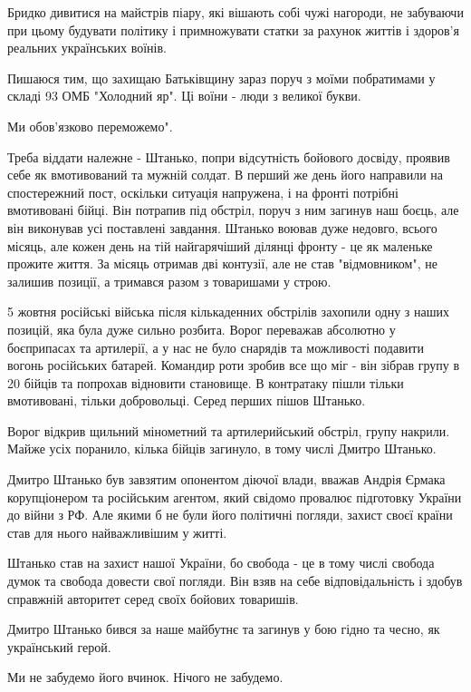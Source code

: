 Бридко дивитися на майстрів піару, які вішають собі чужі нагороди, не забуваючи
при цьому будувати політику і примножувати статки за рахунок життів і здоров'я
реальних українських воїнів.

Пишаюся тим, що захищаю Батьківщину зараз поруч з моїми побратимами у складі 93
ОМБ "Холодний яр". Ці воїни - люди з великої букви.

Ми обов'язково переможемо".

Треба віддати належне - Штанько, попри відсутність бойового досвіду, проявив
себе як вмотивований та мужній солдат. В перший же день його направили на
спостережний пост, оскільки ситуація напружена, і на фронті потрібні
вмотивовані бійці. Він потрапив під обстріл, поруч з ним загинув наш боєць, але
він виконував усі поставлені завдання. Штанько воював дуже недовго, всього
місяць, але кожен день на тій найгарячіший ділянці фронту - це як маленьке
прожите життя. За місяць отримав дві контузії, але не став "відмовником", не
залишив позиції, а тримався разом з товаришами у строю.

5 жовтня російські війська після кількаденних обстрілів захопили одну з наших
позицій, яка була дуже сильно розбита. Ворог переважав абсолютно у боєприпасах
та артилерії, а у нас не було снарядів та можливості подавити вогонь російських
батарей. Командир роти зробив все що міг - він зібрав групу в 20 бійців та
попрохав відновити становище. В контратаку пішли тільки вмотивовані, тільки
добровольці. Серед перших пішов Штанько.

Ворог відкрив щильний мінометний та артилерийський обстріл, групу накрили.
Майже усіх поранило, кілька бійців загинуло, в тому числі Дмитро Штанько.

Дмитро Штанько був завзятим опонентом діючої влади, вважав Андрія Єрмака
корупціонером та російським агентом, який свідомо провалює підготовку України
до війни з РФ. Але якими б не були його політичні погляди, захист своєї країни
став для нього найважливішим у житті.

Штанько став на захист нашої України, бо свобода - це в тому числі свобода
думок та свобода довести свої погляди. Він взяв на себе відповідальність і
здобув справжній авторитет серед своїх бойових товаришів.

Дмитро Штанько бився за наше майбутнє та загинув у бою гідно та чесно, як
український герой.

Ми не забудемо його вчинок. Нічого не забудемо.
